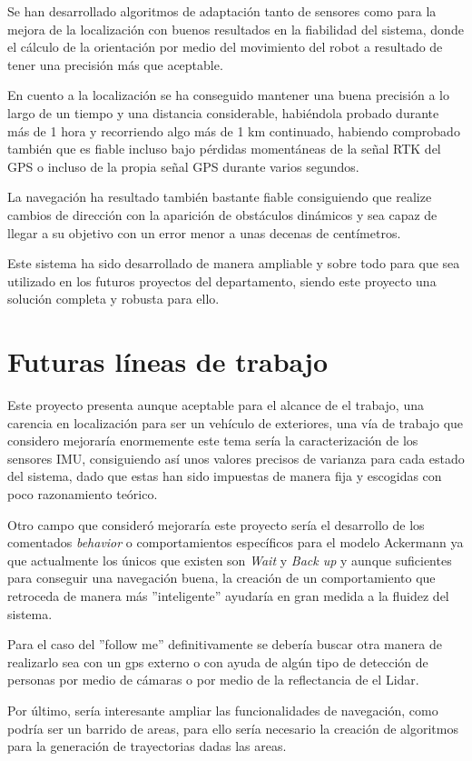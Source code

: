 Se han desarrollado algoritmos de adaptación tanto de sensores como para la mejora de la localización con buenos resultados en la fiabilidad del sistema, donde el cálculo 
de la orientación por medio del movimiento del robot a resultado de tener una precisión más que aceptable.

En cuento a la localización se ha conseguido mantener una buena precisión a lo largo de un tiempo y una distancia considerable, habiéndola probado durante más de 1 hora 
y recorriendo algo más de 1 km continuado, habiendo comprobado también
que es fiable incluso bajo pérdidas momentáneas de la señal RTK del GPS o incluso de la propia señal GPS durante varios segundos.

La navegación ha resultado también bastante fiable consiguiendo que realize cambios de dirección con la aparición de obstáculos dinámicos y sea capaz de 
llegar a su objetivo con un error menor a unas decenas de centímetros.

Este sistema ha sido desarrollado de manera ampliable y sobre todo para que sea utilizado en los futuros proyectos del departamento, 
siendo este proyecto una solución completa y robusta para ello.

\chapter{Futuras líneas de trabajo}

Este proyecto presenta aunque aceptable para el alcance de el trabajo, una carencia en localización para ser un vehículo de exteriores, 
una vía de trabajo que considero mejoraría enormemente este tema sería la caracterización de los sensores IMU, consiguiendo así unos 
valores precisos de varianza para cada estado del sistema, dado que estas han sido impuestas de manera fija y escogidas con poco 
razonamiento teórico.

Otro campo que consideró mejoraría este proyecto sería el desarrollo de los comentados \textit{behavior} o comportamientos específicos para 
el modelo Ackermann ya que actualmente los únicos que existen son \textit{Wait} y \textit{Back up} y aunque suficientes para conseguir una navegación buena,
la creación de un comportamiento que retroceda de manera más ''inteligente'' ayudaría en gran medida a la fluidez del sistema.

Para el caso del ''follow me'' definitivamente se debería buscar otra manera de realizarlo sea con un gps externo o con ayuda de algún tipo de 
detección de personas por medio de cámaras o por medio de la reflectancia de el Lidar.

Por último, sería interesante ampliar las funcionalidades de navegación, como podría ser un barrido de areas, para ello sería necesario 
la creación de algoritmos para la generación de trayectorias dadas las areas.